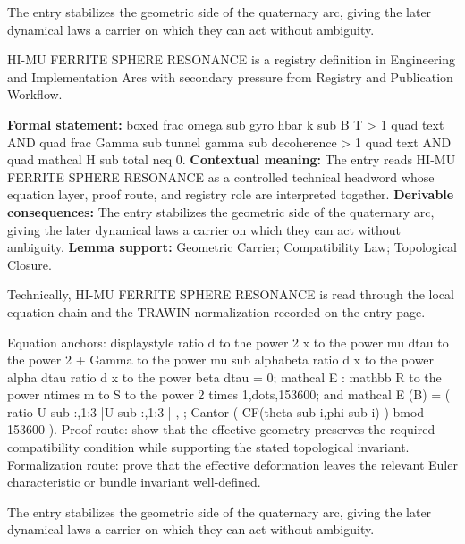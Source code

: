 The entry stabilizes the geometric side of the quaternary arc, giving the later dynamical laws a carrier on which they can act without ambiguity.
\clearpage


\begingroup\small
{}
HI-MU FERRITE SPHERE RESONANCE is a registry definition in Engineering and Implementation Arcs with secondary pressure from Registry and Publication Workflow.

\begingroup\footnotesize\setlength{\emergencystretch}{3em}\sloppy
\textbf{Formal statement:} boxed frac omega sub gyro hbar k sub B T > 1 quad text AND quad frac Gamma sub tunnel gamma sub decoherence > 1 quad text AND quad mathcal H sub total neq 0. \textbf{Contextual meaning:} The entry reads HI-MU FERRITE SPHERE RESONANCE as a controlled technical headword whose equation layer, proof route, and registry role are interpreted together. \textbf{Derivable consequences:} The entry stabilizes the geometric side of the quaternary arc, giving the later dynamical laws a carrier on which they can act without ambiguity. \textbf{Lemma support:} Geometric Carrier; Compatibility Law; Topological Closure.\par
\endgroup

Technically, HI-MU FERRITE SPHERE RESONANCE is read through the local equation chain and the TRAWIN normalization recorded on the entry page.

Equation anchors: displaystyle ratio d to the power 2 x to the power mu dtau to the power 2 + Gamma to the power mu sub alphabeta ratio d x to the power alpha dtau ratio d x to the power beta dtau = 0; mathcal E : mathbb R to the power ntimes m to S to the power 2 times 1,dots,153600; and mathcal E (B) = ( ratio U sub :,1:3 |U sub :,1:3 | , ; Cantor ( CF(theta sub i,phi sub i) ) bmod 153600 ). Proof route: show that the effective geometry preserves the required compatibility condition while supporting the stated topological invariant. Formalization route: prove that the effective deformation leaves the relevant Euler characteristic or bundle invariant well-defined.

The entry stabilizes the geometric side of the quaternary arc, giving the later dynamical laws a carrier on which they can act without ambiguity.
\endgroup

